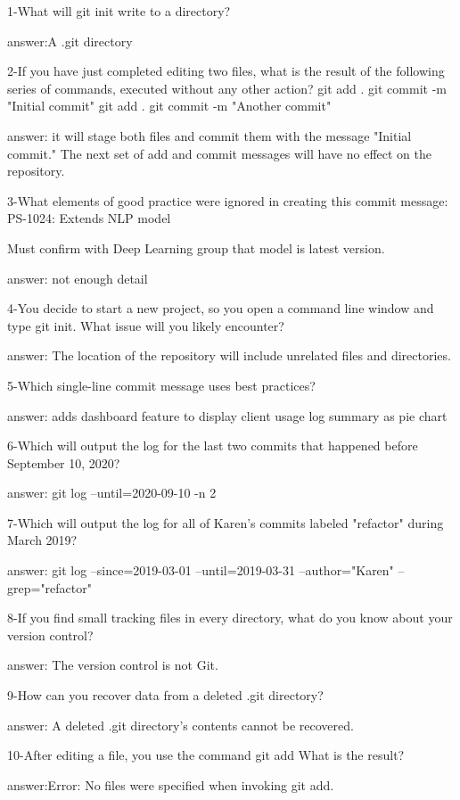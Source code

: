 1-What will git init write to a directory?

answer:A .git directory
 
2-If you have just completed editing two files, what is the result of the following series of commands, executed without any other action? git add . git commit -m "Initial commit" git add . git commit -m "Another commit"

answer: it will stage both files and commit them with the message "Initial commit." The next set of add and commit messages will have no effect on the repository.

3-What elements of good practice were ignored in creating this commit message: 
PS-1024: Extends NLP model

Must confirm with Deep Learning group that model is latest version.

answer: not enough detail

4-You decide to start a new project, so you open a command line window and type git init. What issue will you likely encounter?

answer: The location of the repository will include unrelated files and directories.

5-Which single-line commit message uses best practices?

answer: adds dashboard feature to display client usage log summary as pie chart

6-Which will output the log for the last two commits that happened before September 10, 2020?

answer: git log --until=2020-09-10 -n 2

7-Which will output the log for all of Karen's commits labeled "refactor" during March 2019?

answer: git log --since=2019-03-01 --until=2019-03-31 --author="Karen" --grep="refactor"

8-If you find small tracking files in every directory, what do you know about your version control?

answer: The version control is not Git.

9-How can you recover data from a deleted .git directory?

answer: A deleted .git directory's contents cannot be recovered.

10-After editing a file, you use the command git add What is the result?

answer:Error: No files were specified when invoking git add.
